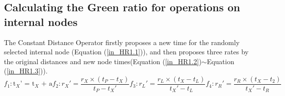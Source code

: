\documentclass{bmcart}
\begin{document}
\begin{backmatter}
\subsection*{Calculating the Green ratio for operations on internal nodes}
The Constant Distance Operator firstly proposes a new time for the randomly selected internal node (Equation (\ref{in_HR1.1})), and then proposes three rates by the original distances and new node times(Equation (\ref{in_HR1.2})$\sim$Equation (\ref{in_HR1.3})).
\begin{subequations}\label{in_HR1}
\begin{equation}\label{in_HR1.1}
{f_1}:{{\text{t}}_X}{\text{'  =  }}{{\text{t}}_X}{\text{  +  a}}
\end{equation}
\begin{equation}\label{in_HR1.2}
{f_2}:{r_X}' = \frac{{{r_X} \times ({t_P} - {t_X})}}{{{t_P} - {t_X}'}}
\end{equation}
\begin{equation}
{f_3}:{r_L}' = \frac{{{r_L} \times ({t_X} - {t_L})}}{{{t_X}' - {t_L}}}
\end{equation}
\begin{equation}\label{in_HR1.3}
{f_4}:{r_R}' = \frac{{{r_R} \times ({t_X} - {t_2})}}{{{t_X}' - {t_R}}}
\end{equation}
\end{subequations}


\end{backmatter}
\end{document}
